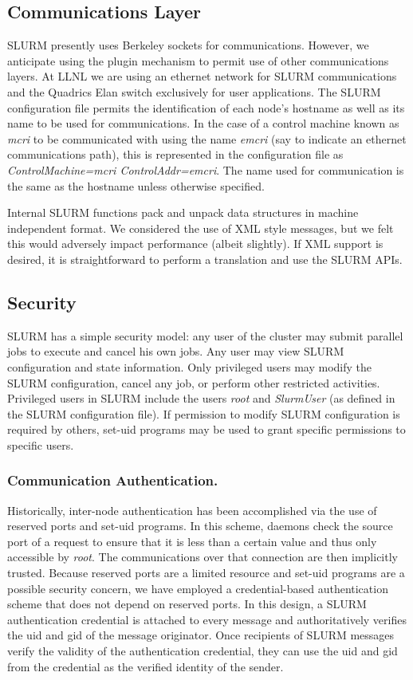 \documentclass[10pt,onecolumn,times]{../common/llncs}
\begin{document}
{\subsection{Communications Layer}

SLURM presently uses Berkeley sockets for communications.  However,
we anticipate using the plugin mechanism to permit use of other
communications layers.  At LLNL we are using an ethernet network
for SLURM communications and the Quadrics Elan switch exclusively
for user applications.  The SLURM configuration file permits the
identification of each node's hostname as well as its name to be used
for communications.  In the case of a control machine known as {\em mcri}
to be communicated with using the name {\em emcri} (say to indicate an
ethernet communications path), this is represented in the configuration
file as {\em ControlMachine=mcri ControlAddr=emcri}.  The name used for
communication is the same as the hostname unless otherwise specified.

Internal SLURM functions pack and unpack data structures in machine
independent format. We considered the use of XML style messages, but we
felt this would adversely impact performance (albeit slightly).  If XML
support is desired, it is straightforward to perform a translation and
use the SLURM APIs.


\subsection{Security}

SLURM has a simple security model: any user of the cluster may submit
parallel jobs to execute and cancel his own jobs.  Any user may view
SLURM configuration and state information.  Only privileged users
may modify the SLURM configuration, cancel any job, or perform other
restricted activities.  Privileged users in SLURM include the users 
{\em root} and {\em SlurmUser} (as defined in the SLURM configuration file).
If permission to modify SLURM configuration is required by others, set-uid
programs may be used to grant specific permissions to specific users.

\subsubsection{Communication Authentication.}

Historically, inter-node authentication has been accomplished via the use
of reserved ports and set-uid programs. In this scheme, daemons check the
source port of a request to ensure that it is less than a certain value
and thus only accessible by {\em root}. The communications over that
connection are then implicitly trusted.  Because reserved ports are a 
limited resource and set-uid programs are a possible security concern,
we have employed a credential-based authentication scheme that
does not depend on reserved ports. In this design, a SLURM authentication
credential is attached to every message and authoritatively verifies the
uid and gid of the message originator. Once recipients of SLURM messages
verify the validity of the authentication credential, they can use the uid
and gid from the credential as the verified identity of the sender.

}
\end{document}
